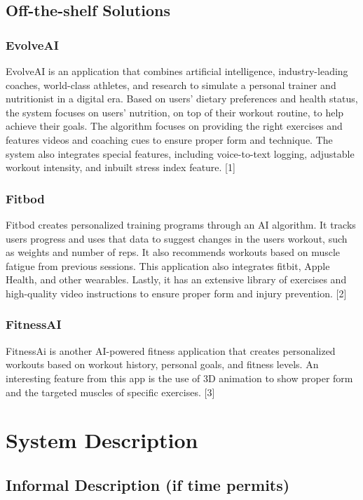 \documentclass[12pt]{article}
\begin{document}
\subsection{Off-the-shelf Solutions}

\subsubsection{EvolveAI}
EvolveAI is an application that combines artificial intelligence, industry-leading coaches, world-class athletes, and research to simulate a personal trainer and nutritionist in a digital era. Based on users’ dietary preferences and health status, the system focuses on users’ nutrition, on top of their workout routine, to help achieve their goals. The algorithm focuses on providing the right exercises and features videos and coaching cues to ensure proper form and technique. The system also integrates special features, including voice-to-text logging, adjustable workout intensity, and inbuilt stress index feature. [1]

\subsubsection{Fitbod}
Fitbod creates personalized training programs through an AI algorithm. It tracks users progress and uses that data to suggest changes in the users workout, such as weights and number of reps. It also recommends workouts based on muscle fatigue from previous sessions. This application also integrates fitbit, Apple Health, and other wearables. Lastly, it has an extensive library of exercises and high-quality video instructions to ensure proper form and injury prevention. [2]

\subsubsection{FitnessAI}
FitnessAi is another AI-powered fitness application that creates personalized workouts based on workout history, personal goals, and fitness levels. An interesting feature from this app is the use of 3D animation to show proper form and the targeted muscles of specific exercises. [3]


\section{System Description}

\subsection{Informal Description (if time permits)}
\end{document}
